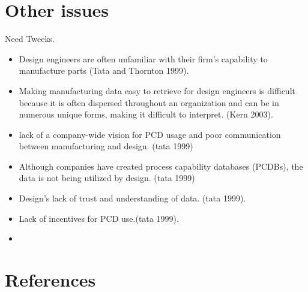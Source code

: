 \documentclass[aip,amsmath,reprint, author-year]{revtex4-1}
\begin{document}
\section{Other issues}

Need Tweeks. 

\begin{itemize}

\item{Design engineers are often unfamiliar with their firm’s capability to manufacture parts (Tata and Thornton 1999).}
\item{Making manufacturing data easy to retrieve for design engineers is difficult because it is often dispersed throughout an organization and can be in numerous unique forms, making it difficult to interpret. (Kern 2003).}
\item{lack of a company-wide vision for PCD usage and poor communication between manufacturing and design. (tata 1999)}
\item{Although companies have created process capability databases (PCDBs), the data is not being utilized by design. (tata 1999)}
\item{Design’s lack of trust and understanding of data. (tata 1999).}
\item{Lack of incentives for PCD use.(tata 1999).}

\item{}

\end{itemize} 



\section*{References}

\end{document}
